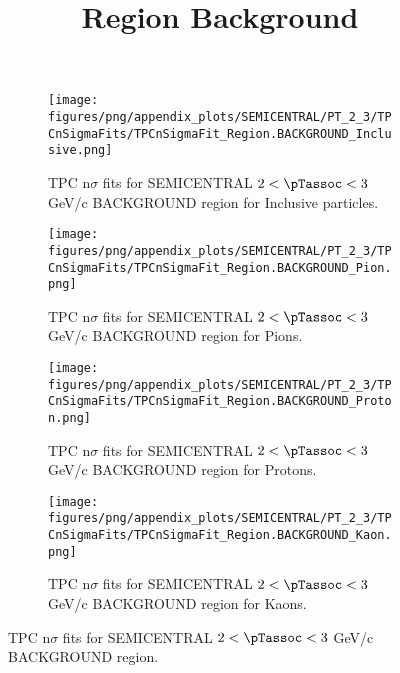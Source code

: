             \begin{figure}[H]
                \title{Region Background}
                \begin{subfigure}[b]{0.5\textwidth}
                    \centering
                    \texttt{[image: figures/png/appendix\_plots/SEMICENTRAL/PT\_2\_3/TPCnSigmaFits/TPCnSigmaFit\_Region.BACKGROUND\_Inclusive.png]}
                    \caption{TPC n$\sigma$ fits for SEMICENTRAL $2 < \pTassoc < 3$ GeV/c BACKGROUND region for Inclusive particles.}
                    \label{fig:appendix_SEMICENTRAL_$2 < \pTassoc < 3$ GeV/c_BACKGROUND_Inclusive}
                \end{subfigure}
                \begin{subfigure}[b]{0.5\textwidth}
                    \centering
                    \texttt{[image: figures/png/appendix\_plots/SEMICENTRAL/PT\_2\_3/TPCnSigmaFits/TPCnSigmaFit\_Region.BACKGROUND\_Pion.png]}
                    \caption{TPC n$\sigma$ fits for SEMICENTRAL $2 < \pTassoc < 3$ GeV/c BACKGROUND region for Pions.}
                    \label{fig:appendix_SEMICENTRAL_$2 < \pTassoc < 3$ GeV/c_BACKGROUND_Pion}
                \end{subfigure}
                \begin{subfigure}[b]{0.5\textwidth}
                    \centering
                    \texttt{[image: figures/png/appendix\_plots/SEMICENTRAL/PT\_2\_3/TPCnSigmaFits/TPCnSigmaFit\_Region.BACKGROUND\_Proton.png]}
                    \caption{TPC n$\sigma$ fits for SEMICENTRAL $2 < \pTassoc < 3$ GeV/c BACKGROUND region for Protons.}
                    \label{fig:appendix_SEMICENTRAL_$2 < \pTassoc < 3$ GeV/c_BACKGROUND_Proton}
                \end{subfigure}
                \begin{subfigure}[b]{0.5\textwidth}
                    \centering
                    \texttt{[image: figures/png/appendix\_plots/SEMICENTRAL/PT\_2\_3/TPCnSigmaFits/TPCnSigmaFit\_Region.BACKGROUND\_Kaon.png]}
                    \caption{TPC n$\sigma$ fits for SEMICENTRAL $2 < \pTassoc < 3$ GeV/c BACKGROUND region for Kaons.}
                    \label{fig:appendix_SEMICENTRAL_$2 < \pTassoc < 3$ GeV/c_BACKGROUND_Kaon}
                \end{subfigure}
                \caption{TPC n$\sigma$ fits for SEMICENTRAL $2 < \pTassoc < 3$ GeV/c BACKGROUND region.}
                \label{fig:appendix_SEMICENTRAL_$2 < \pTassoc < 3$ GeV/c_BACKGROUND}
            \end{figure}
            \clearpage
            

